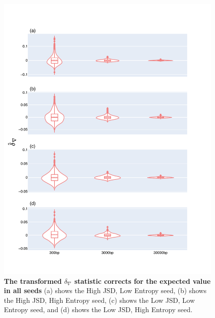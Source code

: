 \begin{figure}[!ht]
\centering
\includegraphics[width=\textwidth]{figures/plots/synthetic/d-conv/all_seeds.pdf}
\caption[The transformed $\delta_\nabla$ statistic corrects for the expected value in all seeds]{\textbf{The transformed $\delta_\nabla$ statistic corrects for the expected value in all seeds} (a) shows the High JSD, Low Entropy seed, (b) shows the High JSD, High Entropy seed, (c) shows the Low JSD, Low Entropy seed, and (d) shows the Low JSD, High Entropy seed.}
\label{fig:synthetic/d-conv/all_seeds}
\end{figure}